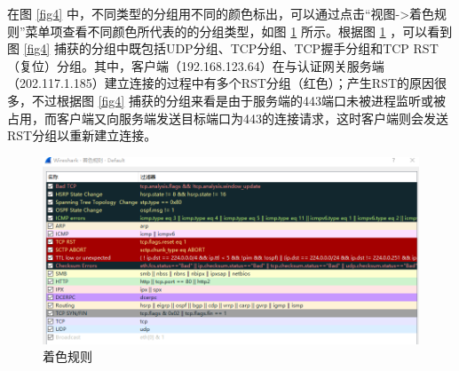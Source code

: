 \qquad
在图 \ref{fig4} 中，不同类型的分组用不同的颜色标出，可以通过点击“视图->着色规则”菜单项查看不同颜色所代表的的分组类型，如图 \ref{fig5} 所示。根据图 \ref{fig5} ，可以看到图 \ref{fig4} 捕获的分组中既包括UDP分组、TCP分组、TCP握手分组和TCP RST（复位）分组。其中，客户端（192.168.123.64）在与认证网关服务端（202.117.1.185）建立连接的过程中有多个RST分组（红色）；产生RST的原因很多，不过根据图 \ref{fig4} 捕获的分组来看是由于服务端的443端口未被进程监听或被占用，而客户端又向服务端发送目标端口为443的连接请求，这时客户端则会发送RST分组以重新建立连接。\\
\begin{figure}
	\centering
	\includegraphics[width=12cm]{image/Wireshark-3}
	\caption{着色规则}
	\label{fig5}
\end{figure}